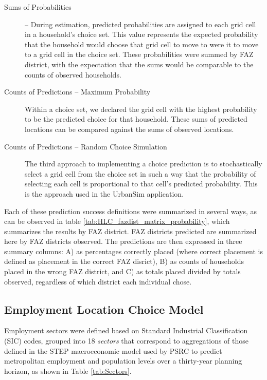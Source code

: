 \begin{description}
    \item[Sums of Probabilities] -- During estimation, predicted
    probabilities are assigned to each grid cell in a household's
    choice set.  This value represents the expected probability that
    the household would choose that grid cell to move to were it to
    move to a grid cell in the choice set.  These probabilities were
    summed by FAZ district, with the expectation that the sums would
    be comparable to the counts of observed households.
    \item[Counts of Predictions -- Maximum Probability]  Within a
    choice set, we declared the grid cell with the highest
    probability to be the predicted choice for that household.
    These sums of predicted locations can be compared against the
    sums of observed locations.
    \item[Counts of Predictions -- Random Choice Simulation] The third approach to implementing a choice prediction is to
    stochastically select a grid cell from the choice set in such
    a way that the probability of selecting each cell is
    proportional to that cell's predicted probability.  This is
    the approach used in the UrbanSim application.
\end{description}

Each of these prediction success definitions were summarized in
several ways, as can be observed in table
\ref{tab:HLC_fazdist_matrix_probability}, which summarizes the
results by FAZ district.  FAZ districts predicted are summarized
here by FAZ districts observed.  The predictions are then
expressed in three summary columns: A) as percentages correctly
placed (where correct placement is defined as placement in the
correct FAZ disrict), B) as counts of households placed in the
wrong FAZ district, and C) as totals placed divided by totals
observed, regardless of which district each individual chose.


\subsection{Employment Location Choice Model}


Employment sectors were defined based on Standard Industrial
Classification (SIC) codes, grouped into 18 \emph{sectors} that
correspond to aggregations of those defined in the STEP
macroeconomic model used by PSRC to predict metropolitan
employment and population levels over a thirty-year planning
horizon, as shown in Table \ref{tab:Sectors}.

